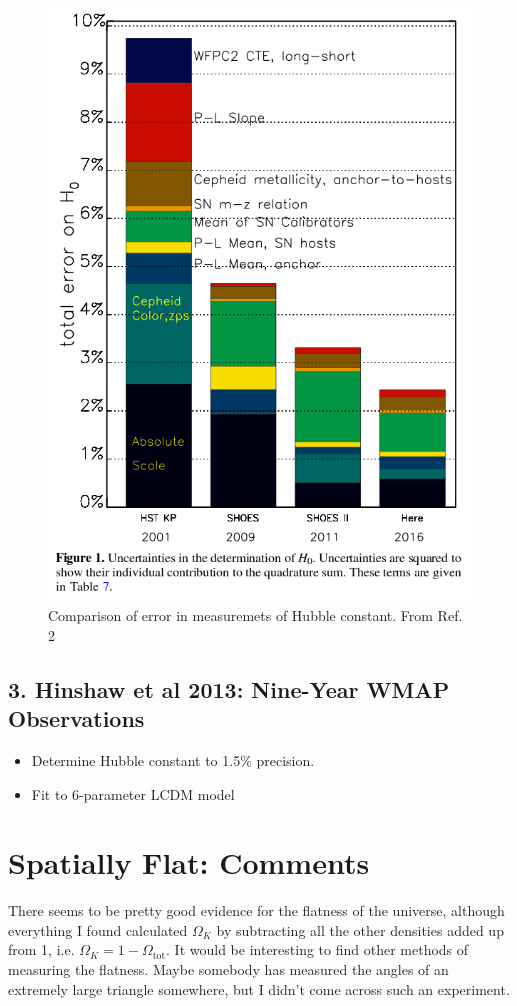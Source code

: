 \documentclass{article}
\begin{document}
\begin{figure}[h]
\begin{minipage}[b]{.4\textwidth}
\begin{center}
\includegraphics[width=\textwidth,angle=0.]{hubble2.png}
\end{center}
\caption{Comparison of error in measuremets of Hubble constant. From Ref. 2}
\end{minipage}
\end{figure}

\subsection*{3. Hinshaw et al 2013: Nine-Year WMAP Observations}
\begin{itemize}
\item Determine Hubble constant to 1.5\% precision.
\item Fit to 6-parameter LCDM model
\end{itemize}


\newpage
\section{Spatially Flat: Comments}
There seems to be pretty good evidence for the flatness of the universe, although everything I found calculated $\Omega_K$ by subtracting all the other densities added up from 1, i.e. $\Omega_K=1-\Omega_{\mathrm{tot}}$. It would be interesting to find other methods of measuring the flatness. Maybe somebody has measured the angles of an extremely large triangle somewhere, but I didn't come across such an experiment. 
\end{document}

